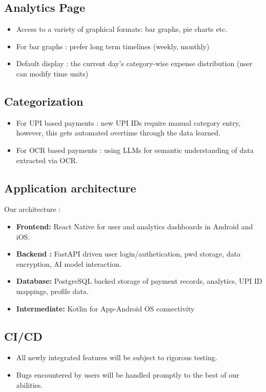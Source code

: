 \documentclass[11pt,a4paper]{article}
\begin{document}
\subsection{Analytics Page %
}
\begin{itemize}[leftmargin=0.7cm]
    \item Access to a variety of graphical formats: bar graphs, pie charts etc.
    \item For bar graphs : prefer long term timelines (weekly, monthly)
    \item Default display : the current day's category-wise expense distribution (user can modify time units)
\end{itemize}

\subsection{Categorization %
}
\begin{itemize}[leftmargin=0.7cm]
    \item For UPI based payments : new UPI IDs require manual category entry, however, this gets automated overtime through the data learned.
    \item For OCR based payments : using LLMs for semantic understanding of data extracted via OCR.
\end{itemize}


\subsection{Application architecture %
}
Our architecture :
\begin{itemize}[leftmargin=0.7cm]
    \item \textbf{Frontend:} React Native for user and analytics dashboards in Android and iOS.
    \item \textbf{Backend :} FastAPI driven user login/authetication, pwd storage, data encryption, AI model interaction.
    \item \textbf{Database:} PostgreSQL backed storage of payment records, analytics, UPI ID mappings, profile data.
    \item \textbf{Intermediate:} Kotlin for App-Android OS connectivity
\end{itemize}

\subsection{CI/CD}
\begin{itemize}[leftmargin=0.7cm]
    \item All newly integrated features will be subject to rigorous testing.
    \item Bugs encountered by users will be handled promptly to the best of our abilities.
\end{itemize}
\end{document}
